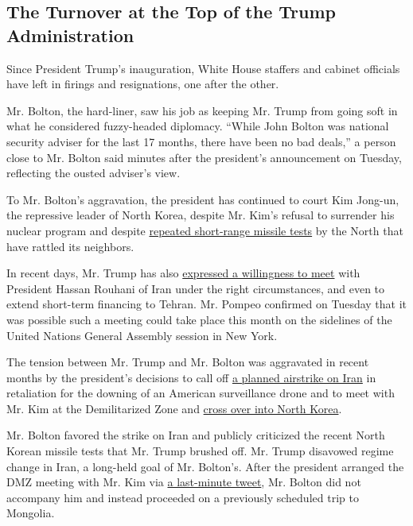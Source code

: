 \hypertarget{the-turnover-at-the-top-of-the-trump-administration}{%
\subsection{The Turnover at the Top of the Trump
Administration}\label{the-turnover-at-the-top-of-the-trump-administration}}

Since President Trump's inauguration, White House staffers and cabinet
officials have left in firings and resignations, one after the other.

Mr. Bolton, the hard-liner, saw his job as keeping Mr. Trump from going
soft in what he considered fuzzy-headed diplomacy. ``While John Bolton
was national security adviser for the last 17 months, there have been no
bad deals,'' a person close to Mr. Bolton said minutes after the
president's announcement on Tuesday, reflecting the ousted adviser's
view.

To Mr. Bolton's aggravation, the president has continued to court Kim
Jong-un, the repressive leader of North Korea, despite Mr. Kim's refusal
to surrender his nuclear program and despite
\href{https://www.nytimes3xbfgragh.onion/2019/07/30/world/asia/north-korea-projectiles.html}{repeated
short-range missile tests} by the North that have rattled its neighbors.

In recent days, Mr. Trump has also
\href{https://www.nytimes3xbfgragh.onion/2019/08/26/world/europe/g7-trump-china-trade-war.html}{expressed
a willingness to meet} with President Hassan Rouhani of Iran under the
right circumstances, and even to extend short-term financing to Tehran.
Mr. Pompeo confirmed on Tuesday that it was possible such a meeting
could take place this month on the sidelines of the United Nations
General Assembly session in New York.

The tension between Mr. Trump and Mr. Bolton was aggravated in recent
months by the president's decisions to call off
\href{https://www.nytimes3xbfgragh.onion/2019/06/20/world/middleeast/iran-us-drone.html}{a
planned airstrike on Iran} in retaliation for the downing of an American
surveillance drone and to meet with Mr. Kim at the Demilitarized Zone
and
\href{https://www.nytimes3xbfgragh.onion/2019/06/30/world/asia/trump-north-korea-dmz.html}{cross
over into North Korea}.

Mr. Bolton favored the strike on Iran and publicly criticized the recent
North Korean missile tests that Mr. Trump brushed off. Mr. Trump
disavowed regime change in Iran, a long-held goal of Mr. Bolton's. After
the president arranged the DMZ meeting with Mr. Kim via
\href{https://twitter.com/realDonaldTrump/status/1144740178948493314}{a
last-minute tweet}, Mr. Bolton did not accompany him and instead
proceeded on a previously scheduled trip to Mongolia.


